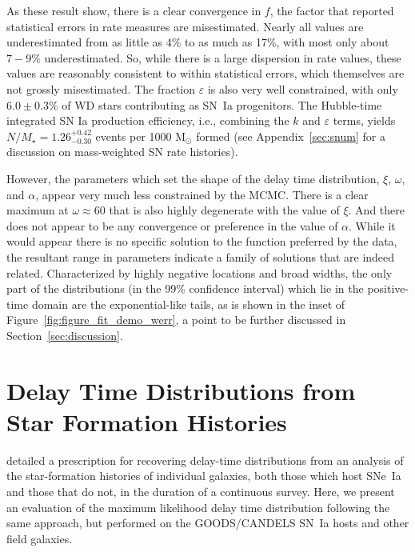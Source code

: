 \documentclass[apj]{aastex62}
\begin{document}
As these result show, there is a clear convergence in $f$, the factor that reported statistical errors in rate measures are misestimated. Nearly all values are underestimated from as little as 4\% to as much as 17\%, with most only about $7-9\%$ underestimated. So, while there is a large dispersion in rate values, these values are reasonably consistent to within statistical errors, which themselves are not grossly misestimated. The fraction $\varepsilon$ is also very well constrained, with only $6.0\pm0.3\%$ of WD stars contributing as SN~Ia progenitors. The Hubble-time integrated SN Ia production efficiency, i.e., combining the $k$ and $\varepsilon$ terms, yields $N/M_{\star}=1.26^{+0.42}_{-0.30}$ events per 1000 M$_{\odot}$ formed (see Appendix~\ref{sec:snum} for a discussion on mass-weighted SN rate histories).


However, the parameters which set the shape of the delay time distribution,  $\xi$, $\omega$, and $\alpha$, appear very much less constrained by the MCMC. There is a clear maximum at $\omega\approx60$ that is also highly degenerate with the value of $\xi$.  And there does not appear to be any convergence or preference in the value of $\alpha$. While it would appear there is no specific solution to the function preferred by the data, the resultant range in parameters indicate a family of solutions that are indeed related. Characterized by highly negative locations and broad widths, the only part of the distributions (in the 99\% confidence interval) which lie in the positive-time domain are the exponential-like tails, as is shown in the inset of Figure~\ref{fig:figure_fit_demo_werr}, a point to be further discussed in Section~\ref{sec:discussion}. 

\section{Delay Time Distributions from Star Formation Histories}\label{sec:sfh}
\cite{Maoz:2011} detailed a prescription for recovering delay-time distributions from an analysis of the star-formation histories of individual galaxies, both those which host SNe~Ia and those that do not, in the duration of a continuous survey. Here, we present an evaluation of the maximum likelihood delay time distribution following the same approach, but performed on the GOODS/CANDELS SN~Ia hosts and other field galaxies. 
\end{document}
